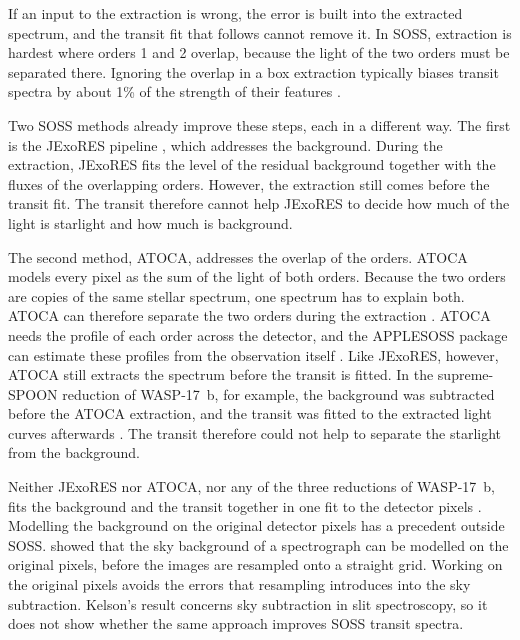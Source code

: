 If an input to the extraction is wrong, the error is built into the extracted
spectrum, and the transit fit that follows cannot remove it. In SOSS,
extraction is hardest where orders 1 and 2 overlap, because the light of the
two orders must be separated there. Ignoring the overlap in a box extraction
typically biases transit spectra by about 1\% of the strength of their
features \citep{DarveauBernierEtAl2022}.

Two SOSS methods already improve these steps, each in a different way. The
first is the JExoRES pipeline \citep{HolmbergMadhusudhan2023}, which
addresses the background. During the extraction, JExoRES fits the level of
the residual background together with the fluxes of the overlapping orders.
However, the extraction still comes before the transit fit. The transit
therefore cannot help JExoRES to decide how much of the light is starlight
and how much is background.

The second method, ATOCA, addresses the overlap of the orders. ATOCA models
every pixel as the sum of the light of both orders. Because the two orders
are copies of the same stellar spectrum, one spectrum has to explain both.
ATOCA can therefore separate the two orders during the extraction
\citep{DarveauBernierEtAl2022}. ATOCA needs the profile of each order across
the detector, and the APPLESOSS package can estimate these profiles from the
observation itself \citep{RadicaEtAl2022}. Like JExoRES, however, ATOCA still
extracts the spectrum before the transit is fitted. In the supreme-SPOON
reduction of WASP-17~b, for example, the background was subtracted before the
ATOCA extraction, and the transit was fitted to the extracted light curves
afterwards \citep{LouieEtAl2025}. The transit therefore could not help to
separate the starlight from the background.

Neither JExoRES nor ATOCA, nor any of the three reductions of WASP-17~b, fits
the background and the transit together in one fit to the detector pixels
\citep{DarveauBernierEtAl2022,RadicaEtAl2023,HolmbergMadhusudhan2023,LouieEtAl2025}.
Modelling the background on the original detector pixels has a precedent
outside SOSS. \citet{Kelson2003} showed that the sky background of a
spectrograph can be modelled on the original pixels, before the images are
resampled onto a straight grid. Working on the original pixels avoids the
errors that resampling introduces into the sky subtraction. Kelson's result
concerns sky subtraction in slit spectroscopy, so it does not show whether
the same approach improves SOSS transit spectra.

